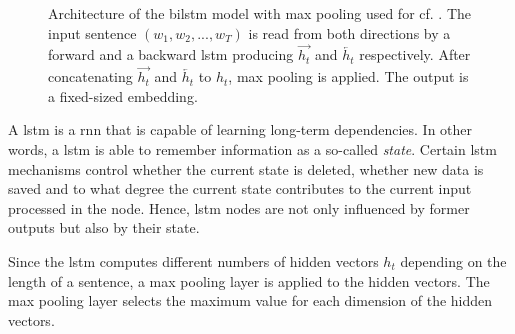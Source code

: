 \begin{figure}[!htb] %
    \centering
    
    \caption[Architecture of \infersent{}]{Architecture of the \ac{bilstm} model with max pooling used for \infersent{} cf. \cite{inferSent2018}.
    The input sentence $(w_1, w_2, ..., w_T)$ is read from both directions by a forward and a backward \ac{lstm} 
    producing $\overrightarrow{h_t}$ and $\overleftarrow{h_t}$ respectively.
    After concatenating $\overrightarrow{h_t}$ and $\overleftarrow{h_t}$ to $h_t$, max pooling is applied.
    The output is a fixed-sized embedding.
    }
    \label{fig:infersent_bilstm}
\end{figure}

A \ac{lstm} is a \ac{rnn} that is capable of learning long-term dependencies.
In other words, 
a \ac{lstm} is able to remember information as a so-called \textit{state}.
Certain \ac{lstm} mechanisms control whether the current state is deleted, whether new data is saved and 
to what degree the current state contributes to the current input processed in the node.
Hence, \ac{lstm} nodes are not only influenced by former outputs but also by their state.

Since the \ac{lstm} computes different numbers of hidden vectors $h_t$ depending on the length of a sentence, a max pooling layer is applied to the hidden vectors.
The max pooling layer selects the maximum value for each dimension of the hidden vectors.

